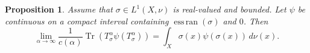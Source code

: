 \documentclass{amsart}
\newtheorem{prop}[thm]{Proposition}
\theoremstyle{definition}
\theoremstyle{remark}
\newtheorem{remark}[thm]{Remark}
\numberwithin{equation}{section}
\begin{document}

\begin{prop}\label{diagonal} Assume that $\sigma\in L^1(X,\nu)$ is real-valued and bounded.
Let $\psi$ be continuous on a compact interval containing
$\operatorname{ess\,ran}(\sigma)$ and $0$. Then
\[
\lim_{\alpha\to\infty}
\frac{1}{c(\alpha)}
\operatorname{Tr}
\left(
T_\sigma^\alpha\psi(T_\sigma^\alpha)
\right)
=
\int_X \sigma(x)\psi(\sigma(x))\,d\nu(x).
\]
\end{prop}
\end{document}
